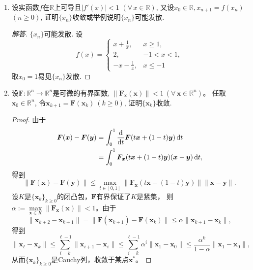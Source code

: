 \begin{2b}
\begin{enumerate}
\begin{proof}
再证\(\{x_n\}\)收敛到\(x^*\), 由于
\[\left|x_{n+1}-x^*\right|=\left|f(x_n)-f(x^*)\right|<\left|x_n-x^*\right|,\]
从而\(\{|x_n-x^*|\}\)单调递减, 设其极限为\(A\), 则\(\{x_n\}\)必存在子列收敛到\(x^*\pm A\). 
不妨设\(\{x_n\}\)本身收敛到\(x^*+A\), 则\(x_{n+1}=f(x_n)\)收敛到\(f(x^*+A)\), 
也即\(x^*+A=f(x^*+A)\), 则\(F(x^*+A)=0\), 由上述知\(A\)只能为\(0\). 从而\(\{x_n\}\)收敛.
\end{proof}
\item 设实函数\(f\)在\(\mathbb{R}\)上可导且\(|f'(x)|<1\) \((\forall\, x\in\mathbb{R})\), 
又设\(x_0\in\mathbb{R},x_{n+1}=f(x_n)\) \((n\geqslant 0)\), 
证明\(\{x_n\}\)收敛或举例说明\(\{x_n\}\)可能发散.
\begin{proof}[解答]
\(\{x_n\}\)可能发散. 设\[f(x)=\begin{cases}
x+\frac{1}{x},&x\geqslant 1,\\
2,&-1<x<1,\\
-x-\frac{1}{x},&x\leqslant -1
\end{cases}\]
取\(x_0=1\)易见\(\{x_n\}\)发散.
\end{proof}
\item 设\(\boldsymbol{F}:\mathbb{R}^n\rightarrow\mathbb{R}^n\)是可微的有界函数, 
\(\left\| \boldsymbol{F_x}(\boldsymbol{x})\right\|<1\ (\forall\,\boldsymbol{x}\in\mathbb{R}^n)\)。
任取\(\boldsymbol{x}_0\in\mathbb{R}^n\), 令\(\boldsymbol{x}_{k+1}=\boldsymbol{F}(\boldsymbol{x}_k)\ (k\geqslant 0)\), 
证明\(\{\boldsymbol{x}_k\}\)收敛.
\begin{proof}
由于
\begin{align*}
    \boldsymbol{F}(\boldsymbol{x})-\boldsymbol{F}(\boldsymbol{y})
    &=\int_0^1\frac{\rm d}{{\rm d}t}\boldsymbol{F}(t\boldsymbol{x}+(1-t)\boldsymbol{y})\,{\rm d}t\\
    &=\int_0^1\boldsymbol{F}_{\!\boldsymbol{x}}(t\boldsymbol{x}+(1-t)\boldsymbol{y})(\boldsymbol{x}-\boldsymbol{y})\,{\rm d}t,
\end{align*}
得到
\[\|\boldsymbol{F}(\boldsymbol{x})-\boldsymbol{F}(\boldsymbol{y})\|
\leqslant\max_{t\in[0,1]}\|\boldsymbol{F}_{\!\boldsymbol{x}}(t\boldsymbol{x}+(1-t)\boldsymbol{y})\|\|\boldsymbol{x}-\boldsymbol{y}\|.\]
设$K$是$\{\boldsymbol{x}_k\}_{k\geqslant0}$的闭凸包，$\boldsymbol{F}$有界保证了$K$是紧集，
则$\alpha:=\max\limits_{\boldsymbol{x} \in K}\|\boldsymbol{F}_{\!\boldsymbol{x}}(\boldsymbol{x})\|<1$。由于
\[\|\boldsymbol{x}_{k+2}-\boldsymbol{x}_{k+1}\|
=\|\boldsymbol{F}(\boldsymbol{x}_{k+1})-\boldsymbol{F}(\boldsymbol{x}_{k})\|
\leqslant\alpha\|\boldsymbol{x}_{k+1}-\boldsymbol{x}_{k}\|,\]
得到
\[\|\boldsymbol{x}_{\ell}-\boldsymbol{x}_{k}\|
\leqslant\sum_{i=k}^{\ell-1}\|\boldsymbol{x}_{i+1}-\boldsymbol{x}_{i}\|
\leqslant\sum_{i=k}^{\ell-1}\alpha^i\|\boldsymbol{x}_{1}-\boldsymbol{x}_{0}\|
\leqslant\frac{\alpha^k}{1-\alpha}\|\boldsymbol{x}_{1}-\boldsymbol{x}_{0}\|,\]
从而$\{\boldsymbol{x}_k\}_{k\geqslant0}$是Cauchy列，收敛于某点$\boldsymbol{x}^*$。


\end{proof}
\end{enumerate}
\end{2b}
